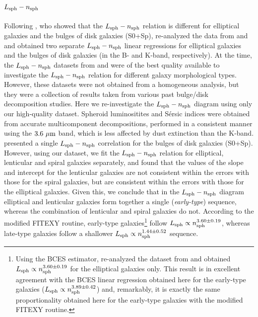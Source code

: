 \documentclass[preprint2]{emulateapj}
\begin{document}
\subsection{$L_{\rm sph} - n_{\rm sph}$}
Following \cite{graham2001bulges}, 
who showed that the $L_{\rm sph} - n_{\rm sph}$ relation is different for elliptical galaxies and the bulges of disk galaxies (S0+Sp), 
\cite{savorgnan2013} re-analyzed the data from \cite{grahamguzman2003} and \cite{grahamworley2008} 
and obtained two separate $L_{\rm sph} - n_{\rm sph}$ linear regressions for elliptical galaxies and the bulges of disk galaxies 
(in the B- and K-band, respectively). 
At the time, the $L_{\rm sph} - n_{\rm sph}$ datasets from \cite{grahamguzman2003} and \cite{grahamworley2008} were of the best quality available 
to investigate the $L_{\rm sph} - n_{\rm sph}$ relation for different galaxy morphological types. 
However, these datasets were not obtained from a homogeneous analysis, 
but they were a collection of results taken from various past bulge/disk decomposition studies. 
Here we re-investigate the $L_{\rm sph} - n_{\rm sph}$ diagram using only our high-quality dataset. 
Spheroid luminositites and S\'ersic indices were obtained from accurate multicomponent decompositions,  
performed in a consistent manner using the $3.6\rm~\mu m$ band, which is less affected by dust extinction than the K-band. \\
\cite{grahamworley2008} presented a single $L_{\rm sph} - n_{\rm sph}$ correlation for the bulges of disk galaxies (S0+Sp).
However, using our dataset, 
we fit the $L_{\rm sph} - n_{\rm sph}$ relation for elliptical, lenticular and spiral galaxies separately, 
and found that the values of the slope and intercept for the lenticular galaxies 
are not consistent within the errors with those for the spiral galaxies, 
but are consistent within the errors with those for the elliptical galaxies.  
Given this, we conclude that in the $L_{\rm sph} - n_{\rm sph}$ diagram 
elliptical and lenticular galaxies form together a single (\emph{early-type}) sequence, 
whereas the combination of lenticular and spiral galaxies do not. 
According to the modified FITEXY routine, 
early-type galaxies\footnote{Using the BCES estimator, 
\cite{savorgnan2013} re-analyzed the dataset from \cite{grahamguzman2003} 
and obtained $L_{\rm sph} \propto n_{\rm sph}^{3.60 \pm 0.19}$ for the elliptical galaxies only. 
This result is in excellent agreement with the BCES linear regression obtained here for the early-type galaxies 
($L_{\rm sph} \propto n_{\rm sph}^{3.89 \pm 0.42}$) 
and, remarkably, it is exactly the same proportionality obtained here for the early-type galaxies with the modified FITEXY routine. } 
follow $L_{\rm sph} \propto n_{\rm sph}^{3.60 \pm 0.19}$, 
whereas late-type galaxies follow a shallower $L_{\rm sph} \propto n_{\rm sph}^{1.44 \pm 0.52}$ sequence. 
\end{document}

